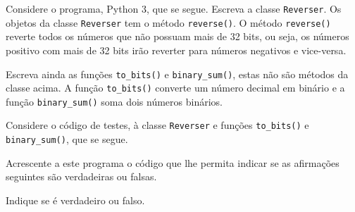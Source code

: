 \documentclass[12pt,varwidth=16cm,border=1pt]{standalone}
\begin{document}
Considere o programa, Python 3, que se segue. Escreva a classe \verb+Reverser+. Os objetos da classe \verb+Reverser+ tem o método \verb+reverse()+. O método \verb+reverse()+ reverte todos os números que não possuam mais de 32 bits, ou seja, os números positivo com mais de 32 bits irão reverter para números negativos e vice-versa. 

Escreva ainda as funções \verb+to_bits()+ e \verb+binary_sum()+, estas não são métodos da classe acima. A função \verb+to_bits()+ converte um número decimal em binário e a função \verb+binary_sum()+ soma dois números binários.



Considere o código de testes, à classe \verb+Reverser+ e funções \verb+to_bits()+ e \verb+binary_sum()+, que se segue.



Acrescente a este programa o código que lhe permita indicar se as
afirmações seguintes são verdadeiras ou falsas.

Indique se é verdadeiro ou falso.
\end{document}
